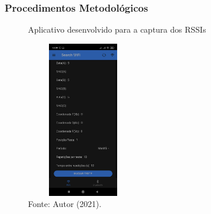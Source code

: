 \documentclass[xcolor={dvipsnames,svgnames,table}]{beamer}
\begin{document}
	\begin{frame}
		\frametitle{Procedimentos Metodológicos}
		\begin{figure}
			\caption{Aplicativo desenvolvido para a captura dos RSSIs}
			\vspace{-5pt}
			\centering
			\includegraphics[width=5cm, height=6.9cm]{imgs/app_1.jpg}
			\vspace{-5pt}
			\caption*{\tiny{Fonte: Autor (2021).}}
		\end{figure}
	\end{frame}
\end{document}
